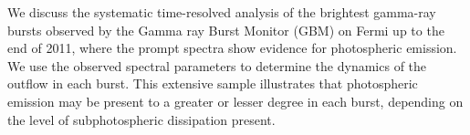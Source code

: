 


\bigskip



\bigskip

\noindent We discuss the systematic time-resolved analysis of the brightest gamma-ray bursts observed by the Gamma ray Burst Monitor (GBM) on Fermi up to the end of 2011, where the prompt spectra show evidence for photospheric emission. We use the observed spectral parameters to determine the dynamics of the outflow in each burst. This extensive sample illustrates that photospheric emission may be present to a greater or lesser degree in each burst, depending on the level of subphotospheric dissipation present.
